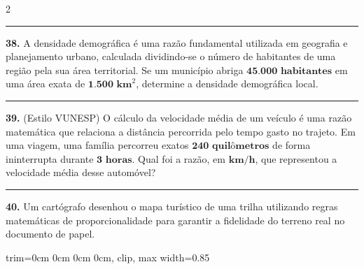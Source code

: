 \documentclass[twoside, 10pt, a4paper]{article}
\newlength{\espacoPreQuestao}\setlength{\espacoPreQuestao}{0.1cm}
\newlength{\espacoQuestao}\setlength{\espacoQuestao}{0.2cm}
\newcommand{\larguraTikz}{0.85\linewidth}
\begin{document}
\begin{multicols*}{2}
\noindent\textcolor{CorLinha}{\rule{\linewidth}{0.5pt}} 
\par\vspace{\espacoPreQuestao}
\textbf{38.} A densidade demográfica é uma razão fundamental utilizada em geografia e planejamento urbano, calculada dividindo-se o número de habitantes de uma região pela sua área territorial. Se um município abriga $ \textbf{45.000 habitantes} $ em uma área exata de $ \textbf{1.500 km}^{2} $, determine a densidade demográfica local.
\par\vspace{\espacoQuestao}

\noindent\textcolor{CorLinha}{\rule{\linewidth}{0.5pt}} 
\par\vspace{\espacoPreQuestao}
\textbf{39.} (Estilo VUNESP) O cálculo da velocidade média de um veículo é uma razão matemática que relaciona a distância percorrida pelo tempo gasto no trajeto. Em uma viagem, uma família percorreu exatos $ \textbf{240 quilômetros} $ de forma ininterrupta durante $ \textbf{3 horas} $. Qual foi a razão, em $ \textbf{km/h} $, que representou a velocidade média desse automóvel?
\par\vspace{\espacoQuestao}

\noindent\textcolor{CorLinha}{\rule{\linewidth}{0.5pt}} 
\par\vspace{\espacoPreQuestao}
\textbf{40.} Um cartógrafo desenhou o mapa turístico de uma trilha utilizando regras matemáticas de proporcionalidade para garantir a fidelidade do terreno real no documento de papel.
\begin{center}
\begin{adjustbox}{trim=0cm 0cm 0cm 0cm, clip, max width=\larguraTikz}
\end{adjustbox}
\end{center}
\end{multicols*}
\end{document}
